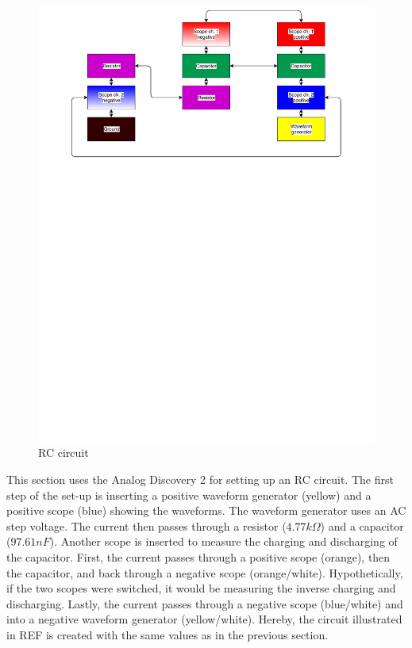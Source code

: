 \begin{figure}[H]
	\center
		\includegraphics[clip, trim=0cm 18cm 0cm 0cm, scale=0.5]{fig/img/test_circuit_1}
	\caption{RC circuit}
\end{figure}
This section uses the Analog Discovery 2 for setting up an RC circuit. The first step of the set-up is inserting a positive waveform generator (yellow) and a positive scope (blue) showing the waveforms. The waveform generator uses an AC step voltage. The current then passes through a resistor ($4.77 k\Omega$) and a capacitor ($97.61 nF$). Another scope is inserted to measure the charging and discharging of the capacitor. First, the current passes through a positive scope (orange), then the capacitor, and back through a negative scope (orange/white). Hypothetically, if the two scopes were switched, it would be measuring the inverse charging and discharging. Lastly, the current passes through a negative scope (blue/white) and into a negative waveform generator (yellow/white). Hereby, the circuit illustrated in REF is created with the same values as in the previous section. \\ \\
